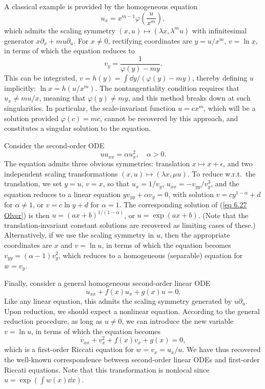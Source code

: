 \begin{example}
    A classical example is provided by the homogeneous equation 
    \[u_x=x^{m-1}\varphi\left(\frac{u}{x^m}\right),\label{eq 6.26 Olver}\]
    which admits the scaling symmetry $(x,u)\mapsto (\lambda x,\lambda^m u)$ with infinitesimal generator $x\partial_x+mu\partial_u$. For $x\neq 0$, rectifying coordinates are $y=u/x^m$, $v=\ln x$, in terms of which the equation reduces to 
    \[v_y=\frac{1}{\varphi(y)-my}.\]
    This can be integrated, $v=h(y)=\int \dd y/(\varphi(y)-my)$, thereby defining $u$ implicitly: $\ln x=h(u/x^m)$. The nontangentiality condition requires that $u_x\neq mu/x$, meaning that $\varphi(y)\neq my$, and this method breaks down at such singularities. In particular, the scale-invariant function $u=cx^m$, which will be a solution provided $\varphi(c)=mc$, cannot be recovered by this approach, and constitutes a singular solution to the equation.
\end{example}

\begin{example}
    Consider the second-order ODE 
    \[uu_{xx}=\alpha u_x^2,\quad \alpha>0.\label{eq 6.27 Olver}\]
    The equation admits three obvious symmetries: translation $x\mapsto x+\epsilon$, and two independent scaling transformations $(x,u)\mapsto (\lambda x,\mu u)$. To reduce w.r.t.\ the translation, we set $y=u$, $v=x$, so that $u_x=1/v_y$, $u_{xx}=-v_{yy}/v_y^3$, and the equation reduces to a linear equation $yv_{yy}+\alpha v_y=0$, with solution $v=c y^{1-\alpha}+d$ for $\alpha\neq 1$, or $v=c\ln y+d$ for $\alpha=1$. The corresponding solution of (\ref{eq 6.27 Olver}) is then $u=(ax+b)^{1/(1-\alpha)}$, or $u=\exp(ax+b)$. (Note that the translation-invariant constant solutions are recovered as limiting cases of these.) Alternatively, if we use the scaling symmetry in $u$, then the appropriate coordinates are $x$ and $v=\ln u$, in terms of which the equation becomes $v_{yy}=(\alpha-1)v_y^2$, which reduces to a homogeneous (separable) equation for $w=v_y$.
\end{example}

\begin{example}\label{ex 2nd order ODE to Riccati}
    Finally, consider a general homogeneous second-order linear ODE 
    \[u_{xx}+f(x)u_x+g(x)u=0.\]
    Like any linear equation, this admits the scaling symmetry generated by $u\partial_u$. Upon reduction, we should expect a nonlinear equation. According to the general reduction procedure, as long as $u\neq 0$, we can introduce the new variable $v=\ln u$, in terms of which the equation becomes 
    \[v_{xx}+v_x^2+f(x)v_x+g(x)=0,\]
    which is a first-order Riccati equation  for $w=v_x=u_x/u$. We have thus recovered the well-known correspondence between second-order linear ODEs and first-order Riccati equations. Note that this transformation is nonlocal since $u=\exp \left(\int w(x)\dd x\right)$.
\end{example}

